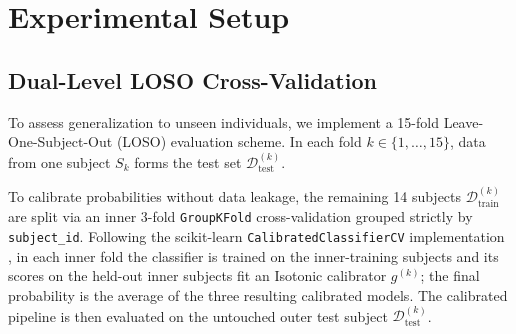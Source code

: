 \documentclass[conference]{IEEEtran}
\begin{document}
\section{Experimental Setup}

\subsection{Dual-Level LOSO Cross-Validation}
To assess generalization to unseen individuals, we implement a 15-fold Leave-One-Subject-Out (LOSO) evaluation scheme. In each fold $k \in \{1, \dots, 15\}$, data from one subject $S_k$ forms the test set $\mathcal{D}_{\text{test}}^{(k)}$. 

To calibrate probabilities without data leakage, the remaining 14 subjects $\mathcal{D}_{\text{train}}^{(k)}$ are split via an inner 3-fold \texttt{GroupKFold} cross-validation grouped strictly by \texttt{subject\_id}. Following the scikit-learn \texttt{CalibratedClassifierCV} implementation \cite{pedregosa2011scikit}, in each inner fold the classifier is trained on the inner-training subjects and its scores on the held-out inner subjects fit an Isotonic calibrator $g^{(k)}$; the final probability is the average of the three resulting calibrated models. The calibrated pipeline is then evaluated on the untouched outer test subject $\mathcal{D}_{\text{test}}^{(k)}$.
\end{document}
